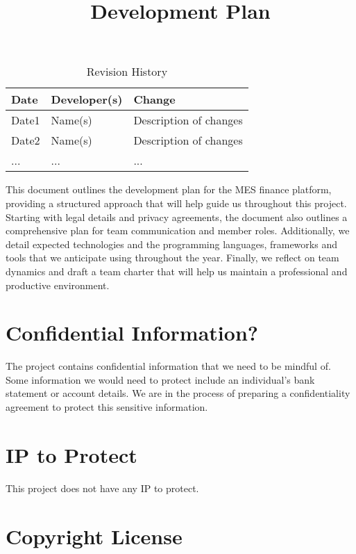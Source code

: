 \documentclass{article}
\title{Development Plan\\\progname}
\author{\authname}
\date{}
\begin{document}
\maketitle

\begin{table}[hp]
\caption{Revision History} \label{TblRevisionHistory}
\begin{tabularx}{\textwidth}{llX}
\toprule
\textbf{Date} & \textbf{Developer(s)} & \textbf{Change}\\
\midrule
Date1 & Name(s) & Description of changes\\
Date2 & Name(s) & Description of changes\\
... & ... & ...\\
\bottomrule
\end{tabularx}
\end{table}

\newpage{}


This document outlines the development plan for the MES finance platform, providing a structured approach that will help guide us throughout this project. Starting with legal details and privacy agreements, the document also outlines a comprehensive plan for team communication and member roles. Additionally, we detail expected technologies and the programming languages, frameworks and tools that we anticipate using throughout the year. Finally, we reflect on team dynamics and draft a team charter that will help us maintain a professional and productive environment.

\section{Confidential Information?}

The project contains confidential information that we need to be mindful of. Some information we would need to protect include an individual's bank statement or account details. We are in the process of preparing a confidentiality agreement to protect this sensitive information.

\section{IP to Protect}

This project does not have any IP to protect. 

\section{Copyright License}
\end{document}
